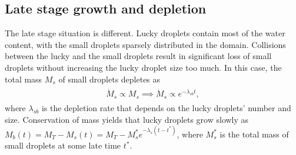 \documentclass[../Rajarshi-thesis-draft.tex]{subfiles}
\begin{document}
\subsection{Late stage growth and depletion}\label{late-sc}
The late stage situation is different. Lucky droplets contain most of the water content, with the small droplets sparsely distributed in the domain. Collisions between the lucky and the small droplets result in significant loss of small droplets without increasing the lucky droplet size too much. In this case, the total mass $M_s$ of small droplets depletes as
\begin{align}
\begin{split}
    \dot{M}_s \propto M_s \implies \dot{M}_s \propto e^{-\lambda_{sb} t} ,
\end{split}
\end{align}
where $\lambda_{sb}$ is the depletion rate that depends on the lucky droplets' number and size. Conservation of mass yields that lucky droplets grow slowly as $M_b(t) = M_T - M_s(t) = M_T - M_s^*e^{-\lambda_s(t - t^*)}$, where $M_s^*$ is the total mass of small droplets at some late time $t^*$. %
\end{document}
